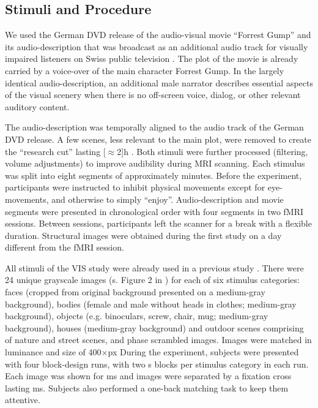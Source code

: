 \documentclass[english]{article}
\begin{document}
\subsection{Stimuli and Procedure}

We used the German DVD release \citep{ForrestGumpDVD} of the audio-visual movie
``Forrest Gump'' \citep{ForrestGumpMovie} and its audio-description that was
broadcast as an additional audio track for visually impaired listeners on Swiss
public television \citep{ForrestGumpGermanAD}.
The plot of the movie is already carried by a voice-over of the main character
Forrest Gump.
In the largely identical audio-description, an additional male narrator
describes essential aspects of the visual scenery when there is no off-screen
voice, dialog, or other relevant auditory content.

The audio-description was temporally aligned to the audio track of the German
DVD release. A few scenes, less relevant to the main plot, were removed to create
the ``research cut'' lasting \unit[$\approx$2]{h} \citep{hanke2014audiomovie,
hanke2016simultaneous}.
Both stimuli were further processed (filtering, volume adjustments) to improve
audibility during MRI scanning.
Each stimulus was split into eight segments of approximately \unit[15]{minutes}.
Before the experiment, participants were instructed to inhibit physical
movements except for eye-movements, and otherwise to simply ``enjoy''.
Audio-description and movie segments were presented in chronological order with
four segments in two fMRI sessions. Between sessions, participants left the
scanner for a break with a flexible duration. Structural images were obtained
during the first study on a day different from the fMRI session.

All stimuli of the VIS study were already used in a previous study
\citep{haxby2011common}.
%
There were 24 unique grayscale images (s. Figure 2 in
\citep{sengupta2016extension}) for each of six stimulus categories:
faces (cropped from original background presented on a medium-gray background),
bodies (female and male without heads in clothes; medium-gray background),
objects (e.g. binoculars, screw, chair, mug; medium-gray background), houses
(medium-gray background) and outdoor scenes comprising of nature and street
scenes, and phase scrambled images.
Images were matched in luminance and size of 400$\times$\unit[400]{px}
During the experiment, subjects were presented with four block-design runs, with
two \unit[16]{s} blocks per stimulus category in each run.
Each image was shown for \unit[900]{ms} and images were separated by a fixation
cross lasting \unit[100]{ms}.
Subjects also performed a one-back matching task to keep them attentive.
\end{document}
